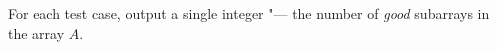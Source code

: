 For each test case, output a single integer "--- the number of \textit{good} subarrays in the array $A$.

